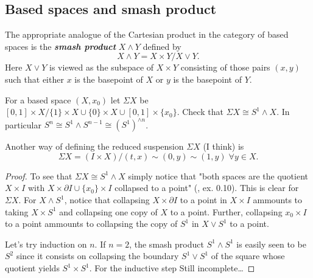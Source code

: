 \subsection{Based spaces and smash product}
\begin{defn}
	The appropriate analogue of the Cartesian product in the category of based spaces is the \textbf{\textit{smash product}} $X\wedge Y$ defined by
	\[X\wedge Y=X\times Y/X\vee Y.\]
	Here $X\vee Y$ is viewed as the subspace of $X\times Y$ consisting of those pairs $(x,y)$ such that either $x$ is the basepoint of $X$ or $y$ is the basepoint of $Y$.
\end{defn}
\begin{exercise}
	For a based space $(X,x_0)$ let $\Sigma X$ be $[0,1]\times X/\{1\}\times X\cup\{0\}\times X\cup[0,1]\times\{x_0\}$. Check that $\Sigma X\cong S^1\wedge X$. In particular $S^n\cong S^1\wedge S^{n-1}\cong (S^1)^{\wedge n}$.
\end{exercise}
\begin{remark}
	Another way of defining the reduced suspension $\Sigma X$ {\color{magenta}(I think)} is
	\[\Sigma X=(I\times X)/(t,x)\sim (0,y)\sim (1,y)\;\forall y\in X.\]
\end{remark}
\begin{proof}
	To see that $\Sigma X\cong S^1\wedge X$ simply notice that "both spaces are the quotient $X\times I$ with $X\times\partial I\cup\{x_0\}\times I$ collapsed to a point" (\cite{hatcher-at}, ex. 0.10). This is clear for $\Sigma X$. For $X\wedge S^1$, notice that collapsing $X\times\partial I$ to a point in $X\times I$ ammounts to taking $X\times S^1$ and collapsing one copy of $X$ to a point. Further, collapsing ${x_0}\times I$ to a point ammounts to collapsing the copy of $S^1$ in $X\vee S^1$ to a point.
	
	Let's try induction on $n$. If $n=2$, the smash product $S^1\wedge S^1$ is easily seen to be $S^2$ since it consists on collapsing the boundary $S^1\vee S^1$ of the square whose quotient yields $S^1\times S^1$. For the inductive step {\color{orange}Still incomplete…}
\end{proof}
